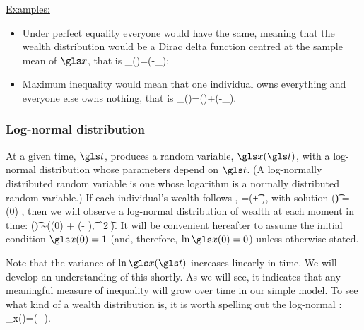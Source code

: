 \underline{Examples:}
\begin{itemize}
\item Under perfect equality everyone would have the same, meaning that the wealth
distribution would be a Dirac delta function centred at the sample mean of $\x$, that is
\be
\PDF_\x(\x)=\delta(\x-\ave{\x}_\N);
\ee
\item
Maximum inequality would mean that one individual owns everything
and everyone else owns nothing, that is
\be 
\PDF_\x(\x)=\delta()+\delta(\x-\N\ave{\x}_\N).
\ee
\end{itemize}


\subsubsection{Log-normal distribution}
At a given time, $\t$, \GBM produces a random variable, $\x(\t)$, with a log-normal distribution whose parameters depend on $\t$. (A log-normally distributed random variable is one whose logarithm is a normally distributed random variable.) If each individual's wealth follows \GBM,
\be
\gd\x=\x(\gmu \gd\t + \gsigma \gd\gW),
\ee
with solution 
\be
\x(\t) = \x(0) \exp{},
\ee
then we will observe a log-normal distribution of wealth at each moment in time:
\be
\ln \x(\t) \sim \mathcal{\N}\left(\ln \x(0) + \left(\gmu - \right)\t, \gsigma^2 \t\right).
\ee
It will be convenient hereafter to assume the initial condition $\x(0)=1$ (and, therefore, $\ln \x(0)=0$) unless otherwise stated.

Note that the variance of $\ln \x(\t)$ increases linearly in time. We will develop an understanding of this shortly. As we will see, it indicates that any meaningful measure of inequality will grow over time in our simple model. To see what kind of a wealth distribution  is, it is worth spelling out the log-normal \PDFa:
\be
\PDF_x(\x)=\exp\left(- \right).
\ee

